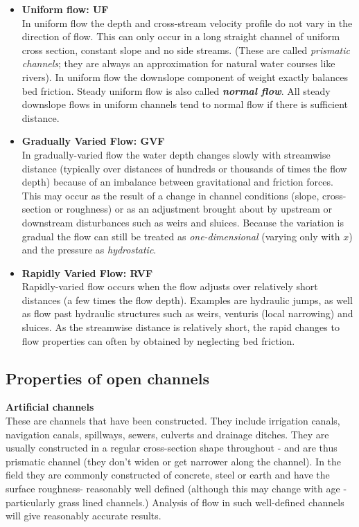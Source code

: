\documentclass[a4paper, 12pt, british]{article} %
\numberwithin{equation}{section}
\numberwithin{figure}{section}
\numberwithin{table}{section}
\begin{document}
\begin{itemize}


\item\textbf{Uniform flow: UF}\\
In uniform flow the depth and cross-stream velocity profile do not vary in the direction of flow. This can only occur in a long straight channel of uniform cross section, constant slope and no side streams. (These are called \textit{prismatic channels}; they are always an approximation for natural water courses like rivers). In uniform flow the downslope component of weight exactly balances bed friction. Steady uniform flow is also called \textbf{\textit{normal flow}}. All steady downslope flows in uniform channels tend to normal flow if there is sufficient distance. 

\item \textbf{Gradually Varied Flow: GVF}\\
In gradually-varied flow the water depth changes slowly with streamwise distance (typically over distances of hundreds or thousands of times the flow depth) because of an imbalance between gravitational and friction forces. This may occur as the result of a change in channel conditions (slope, cross-section or roughness) or as an adjustment brought about by upstream or downstream disturbances such as weirs and sluices. Because the variation is gradual the flow can still be treated as \textit{one-dimensional} (varying only with $x$) and the pressure as \textit{hydrostatic}.  

\item \textbf{Rapidly Varied Flow: RVF}\\
Rapidly-varied flow occurs when the flow adjusts over relatively short distances (a few times the flow depth). Examples are hydraulic jumps, as well as flow past hydraulic structures such as weirs, venturis (local narrowing) and sluices. As the streamwise distance is relatively short, the rapid changes to flow properties can often by obtained by neglecting bed friction.
\end{itemize}

\subsection{Properties  of open channels }

\textbf{Artificial channels}\\
These are channels that have been constructed. They include irrigation canals, navigation canals, spillways, sewers, culverts and drainage ditches. They are usually constructed in a regular cross-section shape throughout - and are thus prismatic channel (they don't widen or get narrower along the channel). In the field they are commonly constructed of concrete, steel or earth and have the surface roughness- reasonably well defined (although this may change with age - particularly grass lined channels.) Analysis of flow in such well-defined channels will give reasonably accurate results.
\end{document}
